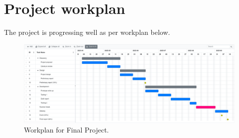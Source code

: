 \section{Project workplan}

The project is progressing well as per workplan below.

\begin{figure}[h]
    \centering
    \includegraphics[width=1\textwidth]{assets/workplan.png}
    \caption{\small Workplan for Final Project.}
    \label{fig:workplan}
\end{figure}